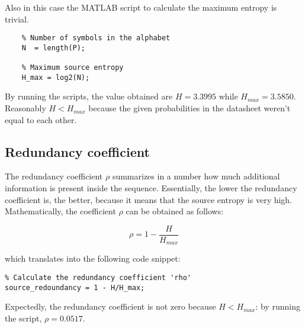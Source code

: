 \noindent Also in this case the MATLAB script to calculate the maximum entropy is trivial.

\begin{lstlisting}
    % Number of symbols in the alphabet
    N  = length(P);

    % Maximum source entropy
    H_max = log2(N);
\end{lstlisting}

\noindent By running the scripts, the value obtained are $H = 3.3995$ while $H_{max} = 3.5850$. Reasonably $H < H_{max}$ because the given probabilities in the datasheet weren't equal to each other.

% 
\subsection{Redundancy coefficient}

The redundancy coefficient $\rho$ summarizes in a number how much additional information is present inside the sequence. Essentially, the lower the redundancy coefficient is, the better, because it means that the source entropy is very high. Mathematically, the coefficient $\rho$ can be obtained as follows:

\begin{equation*}
    \rho = 1 - \frac{H}{H_{max}}    
\end{equation*}

\noindent which translates into the following code snippet:

\begin{lstlisting}
% Calculate the redundancy coefficient 'rho'
source_redoundancy = 1 - H/H_max;
\end{lstlisting}

\noindent Expectedly, the redundancy coefficient is not zero because $H<H_{max}$: by running the script, $\rho = 0.0517$.



